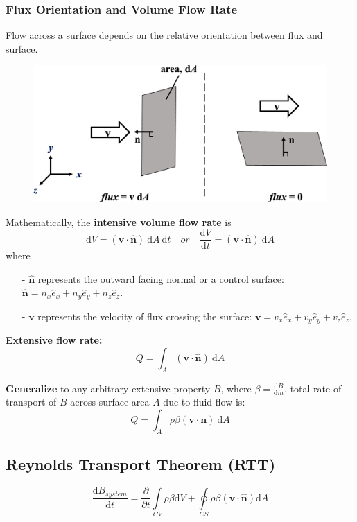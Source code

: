 \documentclass[12pt, a4paper]{article}
\begin{document}
\subsubsection{Flux Orientation and Volume Flow Rate}
Flow across a surface depends on the relative orientation between flux and surface.
\begin{figure}[H]
    \centering
    \includegraphics[width=.7\textwidth]{img/flux_orientation.eps}
\end{figure}
Mathematically, the \textbf{intensive volume flow rate} is
\[ 
    \mathrm{d}V=(\bm{v} \cdot \bm{\hat{n}}) \ \mathrm{d}A \ \mathrm{d}t \quad or \quad \frac{\mathrm{d}V}{\mathrm{d}t}=(\bm{v} \cdot \bm{\hat{n}}) \ \mathrm{d}A 
\]
where
\begin{itemize}
    \item[-] $\bm{\hat{n}}$ represents the outward facing normal or a control surface: $\bm{\hat{n}}=n_{x}\hat{e}_{x}+n_{y}\hat{e}_{y}+n_{z}\hat{e}_{z}$.
    \item[-] $\bm{v}$ represents the velocity of flux crossing the surface: $\bm{v}=v_{x}\hat{e}_{x}+v_{y}\hat{e}_{y}+v_{z}\hat{e}_{z}$.
\end{itemize}

\textbf{Extensive flow rate:}
\[ 
    Q = \int_{A} (\bm{v} \cdot \bm{\hat{n}}) \ \mathrm{d}A 
\]

\textbf{Generalize} to any arbitrary extensive property $B$, where $\beta = \frac{\mathrm{d}B}{\mathrm{d}m}$, total rate of transport of $B$ across surface area $A$ due to fluid flow is:
\[
    Q =  \int_{A} \rho \beta (\bm{v} \cdot \bm{n}) \ \mathrm{d}A 
\]

\subsection{Reynolds Transport Theorem (RTT)}
\begin{equation}
\label{eqn:RTT}
    \frac{\mathrm{d}B_{system}}{\mathrm{d}t} 
    = \frac{\partial}{\partial t} \int\limits_{CV} \rho \beta \mathrm{d}V 
    + \oint\limits_{CS} \rho \beta (\bm{v} \cdot \bm{\hat{n}})\mathrm{d}A 
\end{equation}
\end{document}
